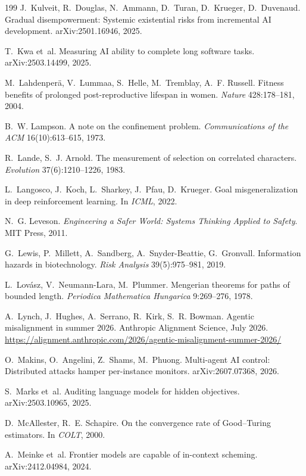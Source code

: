 \documentclass[10pt,twocolumn,letterpaper]{article}
\theoremstyle{definition}
\begin{document}
\begin{thebibliography}{199}
 J.~Kulveit, R.~Douglas, N.~Ammann, D.~Turan, D.~Krueger, D.~Duvenaud. Gradual disempowerment: Systemic existential risks from incremental AI development. arXiv:2501.16946, 2025.

 T.~Kwa et~al. Measuring AI ability to complete long software tasks. arXiv:2503.14499, 2025.

 M.~Lahdenper\"a, V.~Lummaa, S.~Helle, M.~Tremblay, A.~F. Russell. Fitness benefits of prolonged post-reproductive lifespan in women. \emph{Nature} 428:178--181, 2004.

 B.~W. Lampson. A note on the confinement problem. \emph{Communications of the ACM} 16(10):613--615, 1973.

 R.~Lande, S.~J. Arnold. The measurement of selection on correlated characters. \emph{Evolution} 37(6):1210--1226, 1983.

 L.~Langosco, J.~Koch, L.~Sharkey, J.~Pfau, D.~Krueger. Goal misgeneralization in deep reinforcement learning. In \emph{ICML}, 2022.

 N.~G. Leveson. \emph{Engineering a Safer World: Systems Thinking Applied to Safety}. MIT Press, 2011.

 G.~Lewis, P.~Millett, A.~Sandberg, A.~Snyder-Beattie, G.~Gronvall. Information hazards in biotechnology. \emph{Risk Analysis} 39(5):975--981, 2019.

 L.~Lov\'asz, V.~Neumann-Lara, M.~Plummer. Mengerian theorems for paths of bounded length. \emph{Periodica Mathematica Hungarica} 9:269--276, 1978.

 A.~Lynch, J.~Hughes, A.~Serrano, R.~Kirk, S.~R. Bowman. Agentic misalignment in summer 2026. Anthropic Alignment Science, July 2026. \url{https://alignment.anthropic.com/2026/agentic-misalignment-summer-2026/}

 O.~Makins, O.~Angelini, Z.~Shams, M.~Phuong. Multi-agent AI control: Distributed attacks hamper per-instance monitors. arXiv:2607.07368, 2026.

 S.~Marks et~al. Auditing language models for hidden objectives. arXiv:2503.10965, 2025.

 D.~McAllester, R.~E. Schapire. On the convergence rate of Good--Turing estimators. In \emph{COLT}, 2000.

 A.~Meinke et~al. Frontier models are capable of in-context scheming. arXiv:2412.04984, 2024.


\end{thebibliography}
\end{document}
